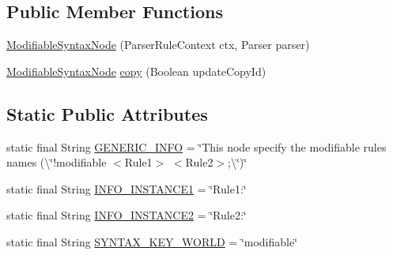 \subsection*{Public Member Functions}
\begin{DoxyCompactItemize}
\item 
\hyperlink{classit_1_1emarolab_1_1cagg_1_1core_1_1language_1_1syntax_1_1abstractTree_1_1syntaxNodeType_1_1ModifiableSyntaxNode_a8d9f22837951f188ed349f003ec28e7a}{Modifiable\-Syntax\-Node} (Parser\-Rule\-Context ctx, Parser parser)
\item 
\hyperlink{classit_1_1emarolab_1_1cagg_1_1core_1_1language_1_1syntax_1_1abstractTree_1_1syntaxNodeType_1_1ModifiableSyntaxNode}{Modifiable\-Syntax\-Node} \hyperlink{classit_1_1emarolab_1_1cagg_1_1core_1_1language_1_1syntax_1_1abstractTree_1_1syntaxNodeType_1_1ModifiableSyntaxNode_a3d2a32794fcbde514c9ce817395cc1d1}{copy} (Boolean update\-Copy\-Id)
\end{DoxyCompactItemize}
\subsection*{Static Public Attributes}
\begin{DoxyCompactItemize}
\item 
static final String \hyperlink{classit_1_1emarolab_1_1cagg_1_1core_1_1language_1_1syntax_1_1abstractTree_1_1syntaxNodeType_1_1ModifiableSyntaxNode_aa0438cc556ec676c8a326b3931e7b439}{G\-E\-N\-E\-R\-I\-C\-\_\-\-I\-N\-F\-O} = \char`\"{}This node specify the modifiable rules names (\textbackslash{}\char`\"{}!modifiable $<$Rule1$>$ $<$Rule2$>$;\textbackslash{}\char`\"{})\char`\"{}
\item 
static final String \hyperlink{classit_1_1emarolab_1_1cagg_1_1core_1_1language_1_1syntax_1_1abstractTree_1_1syntaxNodeType_1_1ModifiableSyntaxNode_a4675e4cbd57f1678f54ebc231615b586}{I\-N\-F\-O\-\_\-\-I\-N\-S\-T\-A\-N\-C\-E1} = \char`\"{}Rule1\-:\char`\"{}
\item 
static final String \hyperlink{classit_1_1emarolab_1_1cagg_1_1core_1_1language_1_1syntax_1_1abstractTree_1_1syntaxNodeType_1_1ModifiableSyntaxNode_a200ce578e4af73d51cc729bf9d1575c8}{I\-N\-F\-O\-\_\-\-I\-N\-S\-T\-A\-N\-C\-E2} = \char`\"{}Rule2\-:\char`\"{}
\item 
static final String \hyperlink{classit_1_1emarolab_1_1cagg_1_1core_1_1language_1_1syntax_1_1abstractTree_1_1syntaxNodeType_1_1ModifiableSyntaxNode_aba4534f1981ddc98a298f479bd7527e9}{S\-Y\-N\-T\-A\-X\-\_\-\-K\-E\-Y\-\_\-\-W\-O\-R\-L\-D} = \char`\"{}modifiable\char`\"{}
\end{DoxyCompactItemize}
